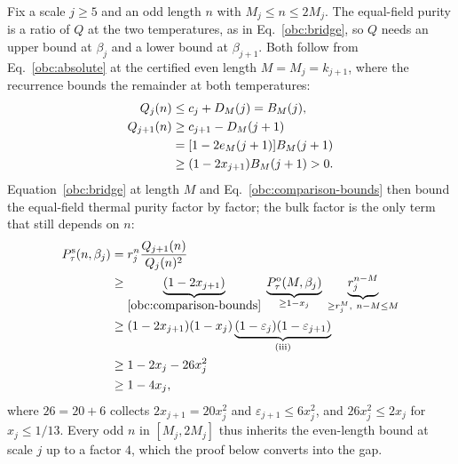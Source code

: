 Fix a scale $j\ge5$ and an odd length $n$ with $M_j\le n\le2M_j$. The
equal-field purity is a ratio of $Q$ at the two temperatures, as in
Eq.~\eqref{obc:bridge}, so $Q$ needs an upper bound at $\beta_j$ and a
lower bound at $\beta_{j+1}$. Both follow from Eq.~\eqref{obc:absolute}
at the certified even length $M=M_j=k_{j+1}$, where the recurrence
bounds the remainder at both temperatures:
\begin{align}
    Q_j(n)     &\le c_j+D_M(j)=B_M(j),\notag\\
    Q_{j+1}(n) &\ge c_{j+1}-D_M(j+1)\notag\\
               &=[1-2e_M(j+1)]B_M(j+1)\notag\\
               &\ge(1-2x_{j+1})B_M(j+1)>0.
    \label{obc:comparison-bounds}
\end{align}
Equation~\eqref{obc:bridge} at length $M$ and
Eq.~\eqref{obc:comparison-bounds} then bound the equal-field thermal
purity factor by factor; the bulk factor is the only term that still
depends on $n$:
\begin{align}
    P_{\tau}^{\mathrm{s}}(n,\beta_j)
     &=r_j^n\frac{Q_{j+1}(n)}{Q_j(n)^2}\notag\\
     &\ge\underbrace{(1-2x_{j+1})}_{\eqref{obc:comparison-bounds}}\;
    \underbrace{P_{\tau}^{\mathrm{o}}(M,\beta_j)}_{\ge1-x_j}\;
    \underbrace{r_j^{n-M}}_{\ge r_j^{M},\ n-M\le M}\notag\\
     &\ge(1-2x_{j+1})(1-x_j)
    \underbrace{(1-\varepsilon_j)(1-\varepsilon_{j+1})}_{\text{(iii)}}\notag\\
     &\ge1-2x_j-26x_j^2\notag\\
     &\ge1-4x_j,
    \label{obc:final-purity}
\end{align}
where $26=20+6$ collects $2x_{j+1}=20x_j^2$ and
$\varepsilon_{j+1}\le6x_j^2$, and $26x_j^2\le2x_j$ for $x_j\le1/13$.
Every odd $n$ in $[M_j,2M_j]$ thus inherits the even-length bound at
scale $j$ up to a factor $4$, which the proof below converts into the gap.

